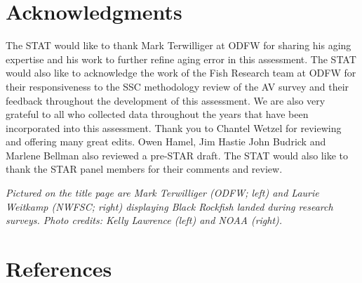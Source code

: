 \documentclass[11pt,
  english,
  letterpaper,
]{article}
\begin{document}
\hypertarget{acknowledgments}{%
\section{Acknowledgments}\label{acknowledgments}}

The STAT would like to thank Mark Terwilliger at ODFW for sharing his aging expertise and his work to further refine aging error in this assessment. The STAT would also like to acknowledge the work of the Fish Research team at ODFW for their responsiveness to the SSC methodology review of the AV survey and their feedback throughout the development of this assessment. We are also very grateful to all who collected data throughout the years that have been incorporated into this assessment. Thank you to Chantel Wetzel for reviewing and offering many great edits. Owen Hamel, Jim Hastie John Budrick and Marlene Bellman also reviewed a pre-STAR draft. The STAT would also like to thank the STAR panel members for their comments and review.

\textit{Pictured on the title page are Mark Terwilliger (ODFW; left) and Laurie Weitkamp (NWFSC; right) displaying Black Rockfish landed during research surveys. Photo credits: Kelly Lawrence (left) and NOAA (right).}

\clearpage

\hypertarget{references}{%
\section{References}\label{references}}
\end{document}
